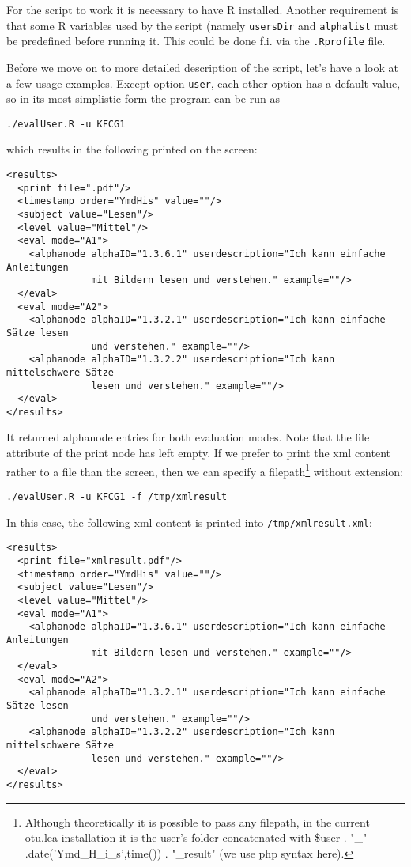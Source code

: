 \documentclass{scrartcl}
\begin{document}
For the script to work it is necessary to have R installed. Another requirement is that some R variables used by the script (namely \verb+usersDir+ and \verb+alphalist+ must be predefined before running it. This could be done f.i. via the \verb+.Rprofile+ file. 

Before we move on to more detailed description of the script, let's have a look at a few usage examples. Except option \verb+user+, each other option has a default value, so in its most simplistic form the program can be run as
\begin{verbatim}
./evalUser.R -u KFCG1
\end{verbatim}
which results in the following printed on the screen:
\begin{verbatim}
<results>
  <print file=".pdf"/>
  <timestamp order="YmdHis" value=""/>
  <subject value="Lesen"/>
  <level value="Mittel"/>
  <eval mode="A1">
    <alphanode alphaID="1.3.6.1" userdescription="Ich kann einfache Anleitungen 
               mit Bildern lesen und verstehen." example=""/>
  </eval>
  <eval mode="A2">
    <alphanode alphaID="1.3.2.1" userdescription="Ich kann einfache Sätze lesen 
               und verstehen." example=""/>
    <alphanode alphaID="1.3.2.2" userdescription="Ich kann mittelschwere Sätze 
               lesen und verstehen." example=""/>
  </eval>
</results>
\end{verbatim}
It returned alphanode entries for both evaluation modes. Note that the file attribute of the print node has left empty. If we prefer to print the xml content rather to a file than the screen, then we can specify a filepath\footnote{Although theoretically it is possible to pass any filepath, in the current otu.lea installation it is the user's folder concatenated with \$user . "\_" .date('Ymd\_H\_i\_s',time()) . "\_result" (we use php syntax here).} without extension:
\begin{verbatim}
./evalUser.R -u KFCG1 -f /tmp/xmlresult 
\end{verbatim}
In this case, the following xml content is printed into \verb+/tmp/xmlresult.xml+:
\begin{verbatim}
<results>
  <print file="xmlresult.pdf"/>
  <timestamp order="YmdHis" value=""/>
  <subject value="Lesen"/>
  <level value="Mittel"/>
  <eval mode="A1">
    <alphanode alphaID="1.3.6.1" userdescription="Ich kann einfache Anleitungen 
               mit Bildern lesen und verstehen." example=""/>
  </eval>
  <eval mode="A2">
    <alphanode alphaID="1.3.2.1" userdescription="Ich kann einfache Sätze lesen 
               und verstehen." example=""/>
    <alphanode alphaID="1.3.2.2" userdescription="Ich kann mittelschwere Sätze 
               lesen und verstehen." example=""/>
  </eval>
</results>
\end{verbatim}
\end{document}
